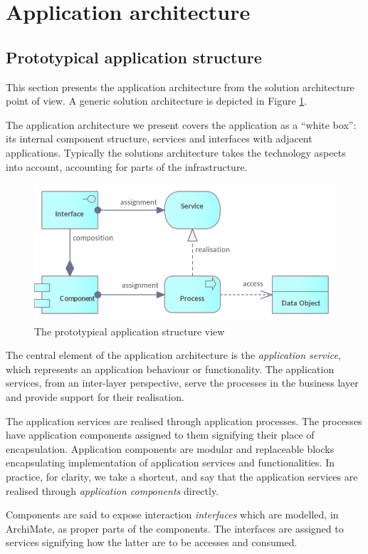 \section{Application architecture}
\label{sec:application-architecture}

	\subsection{Prototypical application structure}
	
	This section presents the application architecture from the solution architecture point of view. A generic solution architecture is depicted in Figure \ref{fig:application-view}.
	
	The application architecture we present covers the application as a ``white box'': its internal component structure, services and interfaces with adjacent applications. Typically the solutions architecture takes the technology aspects into account, accounting for parts of the infrastructure.
	
    \begin{figure}[h]
		\centering
		\includegraphics[width=.5\textwidth]{images/views/Application view.png}
		\caption{The prototypical application structure view}
		\label{fig:application-view}
	\end{figure}

	The central element of the application architecture is the \textit{application service}, which represents an application behaviour or functionality. The application services, from an inter-layer perspective, serve the processes in the business layer and provide support for their realisation. 
	
	
	The application services are realised through application processes. The processes have application components assigned to them signifying their place of encapsulation. Application components are modular and replaceable blocks encapsulating 
	implementation of application services and functionalities. In practice, for clarity, we take a shortcut, and say that the application services are realised through \textit{application components} directly.
	
	Components are said to expose interaction \textit{interfaces} which are modelled, in ArchiMate, as proper parts of the components. The interfaces are assigned to services signifying how the latter are to be accesses and consumed. 
	
